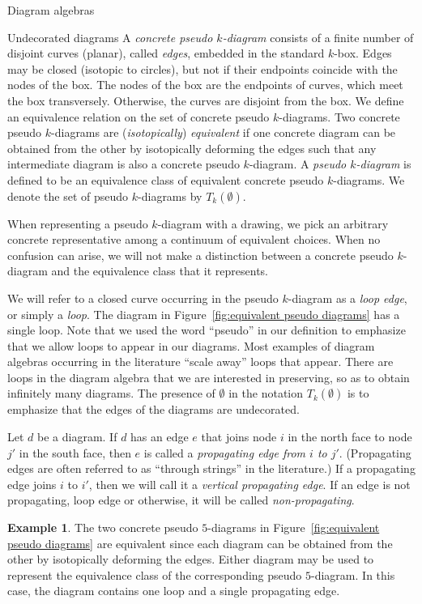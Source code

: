 \documentclass[11pt]{amsart}
\theoremstyle{definition}
\newtheorem{example}[theorem]{Example}
\numberwithin{equation}{section}
\renewcommand{\(}{\left(}
\renewcommand{\)}{\right)}
\begin{document}
\begin{section}{Diagram algebras}
\begin{subsection}{Undecorated diagrams}
A \emph{concrete pseudo $k$-diagram} consists of a finite number of disjoint curves (planar), called \emph{edges}, embedded in the standard $k$-box.  Edges may be closed (isotopic to circles), but not if their endpoints coincide with the nodes of the box.  The nodes of the box are the endpoints of curves, which meet the box transversely.  Otherwise, the curves are disjoint from the box.  We define an equivalence relation on the set of concrete pseudo $k$-diagrams.  Two concrete pseudo $k$-diagrams are (\emph{isotopically}) \emph{equivalent} if one concrete diagram can be obtained from the other by isotopically deforming the edges such that any intermediate diagram is also a concrete pseudo $k$-diagram.  A \emph{pseudo $k$-diagram} is defined to be an equivalence class of equivalent concrete pseudo $k$-diagrams.  We denote the set of pseudo $k$-diagrams by $T_{k}(\emptyset)$.

When representing a pseudo $k$-diagram with a drawing, we pick an arbitrary concrete representative among a continuum of equivalent choices.  When no confusion can arise, we will not make a distinction between a concrete pseudo $k$-diagram and the equivalence class that it represents.  

We will refer to a closed curve occurring in the pseudo $k$-diagram as a \emph{loop edge}, or simply a \emph{loop}.  The diagram in Figure~\ref{fig:equivalent pseudo diagrams} has a single loop.  Note that we used the word ``pseudo'' in our definition to emphasize that we allow loops to appear in our diagrams.  Most examples of diagram algebras occurring in the literature ``scale away'' loops that appear.  There are loops in the diagram algebra that we are interested in preserving, so as to obtain infinitely many diagrams.  The presence of $\emptyset$ in the notation $T_{k}(\emptyset)$ is to emphasize that the edges of the diagrams are undecorated.

Let $d$ be a diagram.  If $d$ has an edge $e$ that joins node $i$ in the north face to node $j'$ in the south face, then $e$ is called a \emph{propagating edge from $i$ to $j'$}.  (Propagating edges are often referred to as ``through strings'' in the literature.)  If a propagating edge joins $i$ to $i'$, then we will call it a \emph{vertical propagating edge}.  If an edge is not propagating, loop edge or otherwise, it will be called \emph{non-propagating}.

\begin{example}\label{ex:equivalent pseudo diagrams}
The two concrete pseudo $5$-diagrams in Figure~\ref{fig:equivalent pseudo diagrams} are equivalent since each diagram can be obtained from the other by isotopically deforming the edges. Either diagram may be used to represent the equivalence class of the corresponding pseudo $5$-diagram. In this case, the diagram contains one loop and a single propagating edge.
\end{example}


\end{subsection}
\end{section}
\end{document}
